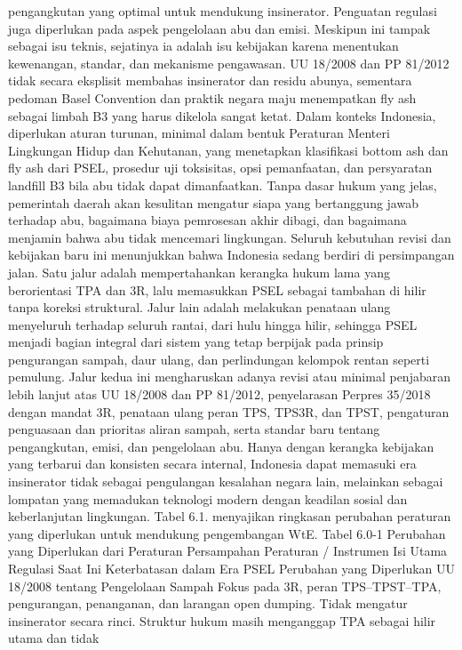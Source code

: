 \documentclass[
  letterpaper,
  DIV=11,
  numbers=noendperiod]{scrreprt}
\begin{document}
pengangkutan yang optimal untuk mendukung insinerator. Penguatan
regulasi juga diperlukan pada aspek pengelolaan abu dan emisi. Meskipun
ini tampak sebagai isu teknis, sejatinya ia adalah isu kebijakan karena
menentukan kewenangan, standar, dan mekanisme pengawasan. UU 18/2008 dan
PP 81/2012 tidak secara eksplisit membahas insinerator dan residu
abunya, sementara pedoman Basel Convention dan praktik negara maju
menempatkan fly ash sebagai limbah B3 yang harus dikelola sangat ketat.
Dalam konteks Indonesia, diperlukan aturan turunan, minimal dalam bentuk
Peraturan Menteri Lingkungan Hidup dan Kehutanan, yang menetapkan
klasifikasi bottom ash dan fly ash dari PSEL, prosedur uji toksisitas,
opsi pemanfaatan, dan persyaratan landfill B3 bila abu tidak dapat
dimanfaatkan. Tanpa dasar hukum yang jelas, pemerintah daerah akan
kesulitan mengatur siapa yang bertanggung jawab terhadap abu, bagaimana
biaya pemrosesan akhir dibagi, dan bagaimana menjamin bahwa abu tidak
mencemari lingkungan. Seluruh kebutuhan revisi dan kebijakan baru ini
menunjukkan bahwa Indonesia sedang berdiri di persimpangan jalan. Satu
jalur adalah mempertahankan kerangka hukum lama yang berorientasi TPA
dan 3R, lalu memasukkan PSEL sebagai tambahan di hilir tanpa koreksi
struktural. Jalur lain adalah melakukan penataan ulang menyeluruh
terhadap seluruh rantai, dari hulu hingga hilir, sehingga PSEL menjadi
bagian integral dari sistem yang tetap berpijak pada prinsip pengurangan
sampah, daur ulang, dan perlindungan kelompok rentan seperti pemulung.
Jalur kedua ini mengharuskan adanya revisi atau minimal penjabaran lebih
lanjut atas UU 18/2008 dan PP 81/2012, penyelarasan Perpres 35/2018
dengan mandat 3R, penataan ulang peran TPS, TPS3R, dan TPST, pengaturan
penguasaan dan prioritas aliran sampah, serta standar baru tentang
pengangkutan, emisi, dan pengelolaan abu. Hanya dengan kerangka
kebijakan yang terbarui dan konsisten secara internal, Indonesia dapat
memasuki era insinerator tidak sebagai pengulangan kesalahan negara
lain, melainkan sebagai lompatan yang memadukan teknologi modern dengan
keadilan sosial dan keberlanjutan lingkungan. Tabel 6.1. menyajikan
ringkasan perubahan peraturan yang diperlukan untuk mendukung
pengembangan WtE. Tabel 6.0-1 Perubahan yang Diperlukan dari Peraturan
Persampahan Peraturan / Instrumen Isi Utama Regulasi Saat Ini
Keterbatasan dalam Era PSEL Perubahan yang Diperlukan UU 18/2008 tentang
Pengelolaan Sampah Fokus pada 3R, peran TPS--TPST--TPA, pengurangan,
penanganan, dan larangan open dumping. Tidak mengatur insinerator secara
rinci. Struktur hukum masih menganggap TPA sebagai hilir utama dan tidak
\end{document}
